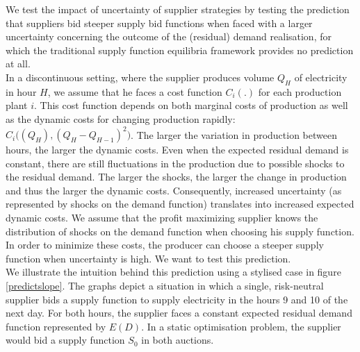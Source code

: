 
We test the impact of uncertainty of supplier strategies by testing the prediction that suppliers bid steeper supply bid functions when faced with a larger uncertainty concerning the outcome of the (residual) demand realisation, for which the traditional supply function equilibria framework provides no prediction at all.\\

In a discontinuous setting, where the supplier produces volume $Q_H$ of electricity in hour $H$, we assume that he faces a cost function $C_i(.)$ for each production plant $i$. This cost function depends on both marginal costs of production as well as the dynamic costs for changing production rapidly: $C_i \bigl( (Q_H), (Q_H - Q_{H-1})^2 \bigr)$. The larger the variation in production between hours, the larger the dynamic costs. 
Even when the expected residual demand is constant, there are still fluctuations in the production due to possible shocks to the residual demand. The larger the shocks, the larger the change in production and thus the larger the dynamic costs. 
Consequently, increased uncertainty (as represented by shocks on the demand function) translates into increased expected dynamic costs. We assume that the profit maximizing supplier knows the distribution of shocks on the demand function when choosing his supply function.  In order to minimize these costs, the producer can choose a steeper supply function when uncertainty is high. We want to test this prediction. \\

We illustrate the intuition behind this prediction using a stylised case in figure \ref{predictslope}. The graphs depict a situation in which a single, risk-neutral supplier bids a supply function to supply electricity in the hours 9 and 10 of the next day. For both hours, the supplier faces a constant expected residual demand function represented by $E(D)$. In a static optimisation problem, the supplier would bid a supply function $S_0$ in both auctions. \\


